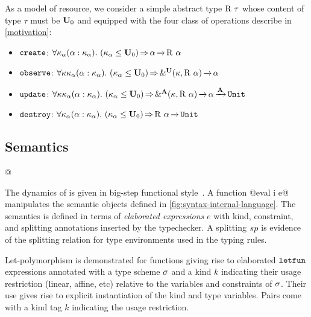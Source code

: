 As a model of resource, we consider a simple abstract
type $\tapp{\tres}{\tau}$ whose content of type $\tau$ must be $\kun_0$ and
equipped with the four class of operations describe in \cref{motivation}:
\begin{itemize}[topsep=0pt]
\item
$\create$:
$\forall{\kvar_\tvar}\bvar{\tvar}{\kvar_\tvar}.\
\qual{\Cleq {\kvar_\tvar} {\kun_0}}
{\tvar \tarr{} \tapp\tres\tvar}$
\item
$\observe$:
$\forall{\kvar\kvar_\tvar}\bvar{\tvar}{\kvar_\tvar}.\
\qual{\Cleq {\kvar_\tvar} {\kun_0}}
{\borrowty[\IBORROW]{\kvar}{\tapp\tres\tvar} \tarr{} \tvar}$
\item
$\update$:
$\forall{\kvar\kvar_\tvar}\bvar{\tvar}{\kvar_\tvar}.\
\qual{\Cleq {\kvar_\tvar} {\kun_0}}
\borrowty[\MBORROW]{\kvar}{\tapp\tres\tvar} \tarr{} \tvar \tarr{\kaff} \tunit$
\item
$\destroy$:
$\forall{\kvar_\tvar}\bvar{\tvar}{\kvar_\tvar}.\
\qual{\Cleq {\kvar_\tvar} {\kun_0}}
\tapp\tres\tvar \tarr{} \tunit$
\end{itemize}

\subsection{Semantics}
\label{sec:sem}


\lstMakeShortInline[keepspaces,style=rule,basicstyle=\normalsize\normalfont]@

The dynamics of \lang is given in big-step
functional
style~\cite{siek13:_type_safet_three_easy_lemmas,DBLP:conf/esop/OwensMKT16,
  DBLP:conf/popl/AminR17}.  A function
@eval \Store \Perm \VEnv i e@
manipulates the semantic objects defined in
\cref{fig:syntax-internal-language}.
%
The semantics is defined in terms of \emph{elaborated expressions} $e$
with kind, constraint, and splitting annotations inserted by the typechecker.
A splitting $\Sp$ is evidence of the splitting relation for type environments
used in the typing rules.

Let-polymorphism is demonstrated for functions giving rise to elaborated
$\eletfun$ expressions annotated with a type scheme $\schm$ and a kind $k$ indicating their
usage restriction (linear, affine, etc) relative to the variables and
constraints of $\schm$. Their use
gives rise to explicit instantiation of the kind and type variables.
Pairs come with a kind tag $k$ indicating the usage restriction.

